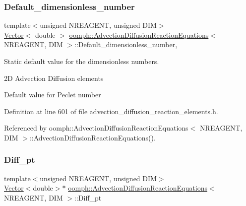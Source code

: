 \subsubsection{\texorpdfstring{Default\+\_\+dimensionless\+\_\+number}{Default\_dimensionless\_number}}
{\footnotesize\ttfamily template$<$unsigned N\+R\+E\+A\+G\+E\+NT, unsigned D\+IM$>$ \\
\hyperlink{classoomph_1_1Vector}{Vector}$<$ double $>$ \hyperlink{classoomph_1_1AdvectionDiffusionReactionEquations}{oomph\+::\+Advection\+Diffusion\+Reaction\+Equations}$<$ N\+R\+E\+A\+G\+E\+NT, D\+IM $>$\+::Default\+\_\+dimensionless\+\_\+number\hspace{0.3cm}{\ttfamily [static]}, {\ttfamily [private]}}



Static default value for the dimensionless numbers. 

2D Advection Diffusion elements

Default value for Peclet number 

Definition at line 601 of file advection\+\_\+diffusion\+\_\+reaction\+\_\+elements.\+h.



Referenced by oomph\+::\+Advection\+Diffusion\+Reaction\+Equations$<$ N\+R\+E\+A\+G\+E\+N\+T, D\+I\+M $>$\+::\+Advection\+Diffusion\+Reaction\+Equations().

\mbox{\label{classoomph_1_1AdvectionDiffusionReactionEquations_af88a7b3b2daee6c339ee75914ae1c23e}} 
\subsubsection{\texorpdfstring{Diff\+\_\+pt}{Diff\_pt}}
{\footnotesize\ttfamily template$<$unsigned N\+R\+E\+A\+G\+E\+NT, unsigned D\+IM$>$ \\
\hyperlink{classoomph_1_1Vector}{Vector}$<$double$>$$\ast$ \hyperlink{classoomph_1_1AdvectionDiffusionReactionEquations}{oomph\+::\+Advection\+Diffusion\+Reaction\+Equations}$<$ N\+R\+E\+A\+G\+E\+NT, D\+IM $>$\+::Diff\+\_\+pt\hspace{0.3cm}{\ttfamily [protected]}}



